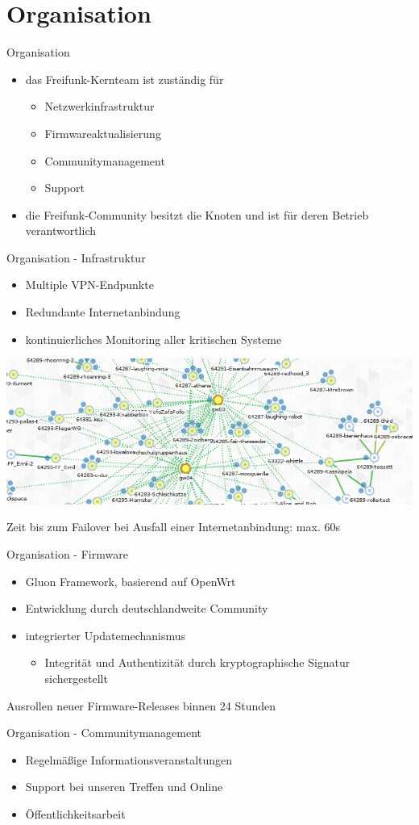 \documentclass{beamer}
\begin{document}
\section{Organisation}
\begin{frame}{Organisation}
\vfill
\begin{itemize}
\item das Freifunk-Kernteam ist zuständig für
	\begin{itemize}
	\item Netzwerkinfrastruktur
	\item Firmwareaktualisierung
	\item Communitymanagement
	\item Support
	\end{itemize}
\vfill
\item die Freifunk-Community besitzt die Knoten und ist für deren Betrieb verantwortlich
\end{itemize}
\vfill
\end{frame}

\begin{frame}{Organisation - Infrastruktur}
\vfill
\begin{itemize}
	\item Multiple VPN-Endpunkte
	\item Redundante Internetanbindung
	\item kontinuierliches Monitoring aller kritischen Systeme
\end{itemize}
\begin{center}
\includegraphics[width=\textwidth]{images/2015-01-28-graph}
\end{center}
\vfill
Zeit bis zum Failover bei Ausfall einer Internetanbindung: max. 60s
\vfill
\end{frame}

\begin{frame}{Organisation - Firmware}
\vfill
\begin{itemize}
	\item Gluon Framework, basierend auf OpenWrt
	\item Entwicklung durch deutschlandweite Community
	\item integrierter Updatemechanismus
	\begin{itemize}
		\item Integrität und Authentizität durch kryptographische Signatur sichergestellt
	\end{itemize}
\end{itemize}
\vfill
Ausrollen neuer Firmware-Releases binnen 24 Stunden
\vfill
\end{frame}
	
\begin{frame}{Organisation - Communitymanagement}
\vfill
\begin{itemize}
\item Regelmäßige Informationsveranstaltungen
\item Support bei unseren Treffen und Online
\item Öffentlichkeitsarbeit
\end{itemize}
\vfill
\end{frame}
\end{document}
